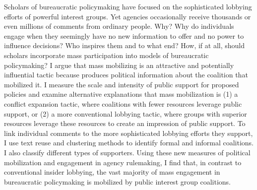 Scholars of bureaucratic policymaking have focused on the sophisticated lobbying efforts of powerful interest groups. Yet agencies occasionally receive thousands or even millions of comments from ordinary people. Why? Why do individuals engage when they seemingly have no new information to offer and no power to influence decisions? Who inspires them and to what end? How, if at all, should scholars incorporate mass participation into models of bureaucratic policymaking? 
I argue that mass mobilizing is an attractive and potentially influential tactic because produces political information about the coalition that mobilized it. I measure the scale and intensity of public support for proposed policies and examine alternative explanations that mass mobilization is (1) a conflict expansion tactic, where coalitions with fewer resources leverage public support, or (2) a more conventional lobbying tactic, where groups with superior resources leverage these resources to create an impression of public support. 
To link individual comments to the more sophisticated lobbying efforts they support, I use text reuse and clustering methods to identify formal and informal coalitions. I also classify different types of supporters. Using these new measures of political mobilization and engagement in agency rulemaking, I find that, in contrast to conventional insider lobbying, the vast majority of mass engagement in bureaucratic policymaking is mobilized by public interest group coalitions.
